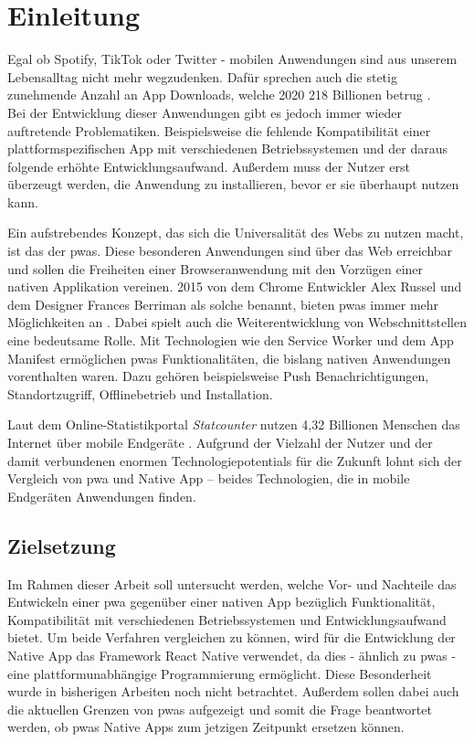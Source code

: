 \chapter{Einleitung}\label{ch:intro}
Egal ob Spotify, TikTok oder Twitter - mobilen Anwendungen sind aus unserem Lebensalltag nicht mehr wegzudenken.
Dafür sprechen auch die stetig zunehmende Anzahl an App Downloads, welche 2020 218 Billionen betrug \cite{Iqbal.06.05.2021}.\\
Bei der Entwicklung dieser Anwendungen gibt es jedoch immer wieder auftretende Problematiken.
Beispielsweise die fehlende Kompatibilität einer plattformspezifischen App mit verschiedenen Betriebssystemen und der daraus folgende erhöhte Entwicklungsaufwand.
Außerdem muss der Nutzer erst überzeugt werden, die Anwendung zu installieren, bevor er sie überhaupt nutzen kann.

Ein aufstrebendes Konzept, das sich die Universalität des Webs zu nutzen macht, ist das der \acp{pwa}.
Diese besonderen Anwendungen sind über das Web erreichbar und sollen die Freiheiten einer Browseranwendung mit den Vorzügen einer nativen Applikation vereinen.
2015 von dem Chrome Entwickler Alex Russel und dem Designer Frances Berriman als solche benannt, bieten \acp{pwa} immer mehr Möglichkeiten an \cite{Russell.2015}.
Dabei spielt auch die Weiterentwicklung von Webschnittstellen eine bedeutsame Rolle.
Mit Technologien wie den Service Worker und dem App Manifest ermöglichen \acp{pwa} Funktionalitäten, die bislang nativen Anwendungen vorenthalten waren.
Dazu gehören beispielsweise Push Benachrichtigungen, Standortzugriff, Offlinebetrieb und Installation.

Laut dem Online-Statistikportal \textit{Statcounter} nutzen 4,32 Billionen Menschen das Internet über mobile Endgeräte \cite{StatCounter.2021}.
Aufgrund der Vielzahl der Nutzer und der damit verbundenen enormen Technologiepotentials für die Zukunft lohnt sich der Vergleich von \ac{pwa} und Native App – beides Technologien, die in mobile Endgeräten Anwendungen finden. 

\section{Zielsetzung}
Im Rahmen dieser Arbeit soll untersucht werden, welche Vor- und Nachteile das Entwickeln einer \ac{pwa} gegenüber einer nativen App bezüglich Funktionalität, Kompatibilität mit verschiedenen Betriebssystemen und Entwicklungsaufwand bietet.
Um beide Verfahren vergleichen zu können, wird für die Entwicklung der Native App das Framework React Native verwendet, da dies - ähnlich zu \acp{pwa} - eine plattformunabhängige Programmierung ermöglicht.
Diese Besonderheit wurde in bisherigen Arbeiten noch nicht betrachtet.
Außerdem sollen dabei auch die aktuellen Grenzen von \acp{pwa} aufgezeigt und somit die Frage beantwortet werden, ob \acp{pwa} Native Apps zum jetzigen Zeitpunkt ersetzen können.

